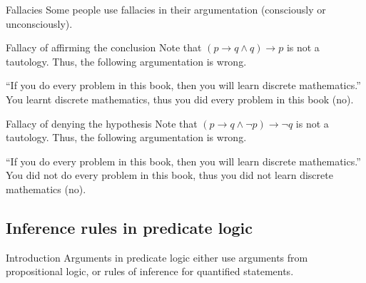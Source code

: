 \documentclass{article}
\begin{document}
\begin{parag}{Fallacies}
    Some people use fallacies in their argumentation (consciously or unconsciously).

    \begin{subparag}{Fallacy of affirming the conclusion}
        Note that $\left(p \to q \land q\right) \to p$ is not a tautology. Thus, the following argumentation is wrong.

        ``If you do every problem in this book, then you will learn discrete mathematics.'' You learnt discrete mathematics, thus you did every problem in this book (no).
    \end{subparag}

    \begin{subparag}{Fallacy of denying the hypothesis}
        Note that $\left(p \to q \land\lnot p\right) \to \lnot q$ is not a tautology. Thus, the following argumentation is wrong.

        ``If you do every problem in this book, then you will learn discrete mathematics.'' You did not do every problem in this book, thus you did not learn discrete mathematics (no).
    \end{subparag}
\end{parag}

\subsection{Inference rules in predicate logic}
\begin{parag}{Introduction}
    Arguments in predicate logic either use arguments from propositional logic, or rules of inference for quantified statements.
\end{parag}
\end{document}
